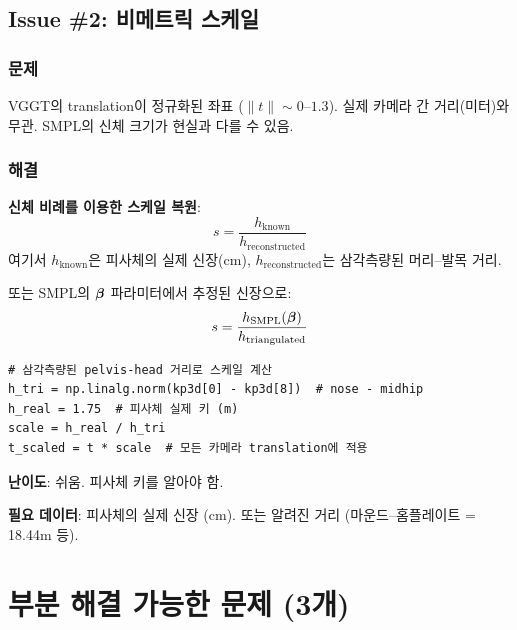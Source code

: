 \documentclass[11pt, a4paper]{report}
\begin{document}
\section{Issue \#2: 비메트릭 스케일}

\subsection{문제}
VGGT의 translation이 정규화된 좌표 ($\|t\| \sim 0$--$1.3$). 실제 카메라 간 거리(미터)와 무관. SMPL의 신체 크기가 현실과 다를 수 있음.

\subsection{해결}

\begin{mathbox}
\textbf{신체 비례를 이용한 스케일 복원}:
\begin{equation}
s = \frac{h_\text{known}}{h_\text{reconstructed}}
\end{equation}
여기서 $h_\text{known}$은 피사체의 실제 신장(cm), $h_\text{reconstructed}$는 삼각측량된 머리--발목 거리.

또는 SMPL의 $\bm{\beta}$ 파라미터에서 추정된 신장으로:
\begin{equation}
s = \frac{h_\text{SMPL}(\bm{\beta})}{h_\text{triangulated}}
\end{equation}
\end{mathbox}

\begin{devbox}
\begin{verbatim}
# 삼각측량된 pelvis-head 거리로 스케일 계산
h_tri = np.linalg.norm(kp3d[0] - kp3d[8])  # nose - midhip
h_real = 1.75  # 피사체 실제 키 (m)
scale = h_real / h_tri
t_scaled = t * scale  # 모든 카메라 translation에 적용
\end{verbatim}
\textbf{난이도}: 쉬움. 피사체 키를 알아야 함.
\end{devbox}

\begin{dataneedbox}
\textbf{필요 데이터}: 피사체의 실제 신장 (cm). 또는 알려진 거리 (마운드--홈플레이트 = 18.44m 등).
\end{dataneedbox}


\chapter{부분 해결 가능한 문제 (3개)}
\label{ch:partial}
\end{document}

